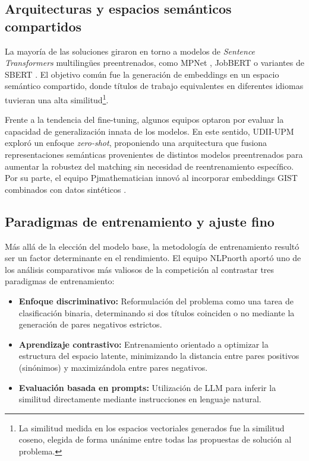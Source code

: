 \subsection{Arquitecturas y espacios semánticos compartidos}

\noindent La mayoría de las soluciones giraron en torno a modelos de \textit{Sentence Transformers} multilingües preentrenados, como MPNet \cite{brikman2025multilingual}, JobBERT \cite{decorte2025multilingual} o variantes de SBERT \cite{nizami2025enhancing,bhangale2025fine}. El objetivo común fue la generación de embeddings en un espacio semántico compartido, donde títulos de trabajo equivalentes en diferentes idiomas tuvieran una alta similitud\footnote{La similitud medida en los espacios vectoriales generados fue la similitud coseno, elegida de forma unánime entre todas las propuestas de solución al problema.}.

Frente a la tendencia del fine-tuning, algunos equipos optaron por evaluar la capacidad de generalización innata de los modelos. En este sentido, UDII-UPM \cite{rodriguez2025udii} exploró un enfoque \textit{zero-shot}, proponiendo una arquitectura que fusiona representaciones semánticas provenientes de distintos modelos preentrenados para aumentar la robustez del matching sin necesidad de reentrenamiento específico. Por su parte, el equipo Pjmathematician innovó al incorporar embeddings GIST combinados con datos sintéticos \cite{vachharajani2025pjmathematician}.

\subsection{Paradigmas de entrenamiento y ajuste fino}

\noindent Más allá de la elección del modelo base, la metodología de entrenamiento resultó ser un factor determinante en el rendimiento. El equipo NLPnorth \cite{zhang2025nlpnorth} aportó uno de los análisis comparativos más valiosos de la competición al contrastar tres paradigmas de entrenamiento:

\begin{itemize}
    \item \textbf{Enfoque discriminativo:} Reformulación del problema como una tarea de clasificación binaria, determinando si dos títulos coinciden o no mediante la generación de pares negativos estrictos.
    \item \textbf{Aprendizaje contrastivo:} Entrenamiento orientado a optimizar la estructura del espacio latente, minimizando la distancia entre pares positivos (sinónimos) y maximizándola entre pares negativos.
    \item \textbf{Evaluación basada en prompts:} Utilización de \gls{LLM} para inferir la similitud directamente mediante instrucciones en lenguaje natural.
\end{itemize}

